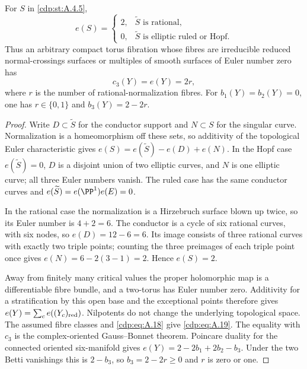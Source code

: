 
\begin{proposition}\label{cdp:st:A.4.6}
For $S$ in \ref{cdp:st:A.4.5},
\[
e(S)=\begin{cases}
2,&\widetilde S\text{ is rational},\\
0,&\widetilde S\text{ is elliptic ruled or Hopf}.
\end{cases}
\tag{A.18}\label{cdp:eq:A.18}
\]
Thus an arbitrary compact torus fibration whose fibres are irreducible reduced normal-crossings surfaces or multiples of smooth surfaces of Euler number zero has
\[
c_3(Y)=e(Y)=2r,
\tag{A.19}\label{cdp:eq:A.19}
\]
where $r$ is the number of rational-normalization fibres. For $b_1(Y)=b_2(Y)=0$, one has $r\in\{0,1\}$ and $b_3(Y)=2-2r$.
\end{proposition}
\begin{proof}
Write $D\subset\widetilde S$ for the conductor support and $N\subset S$ for the singular curve. Normalization is a homeomorphism off these sets, so additivity of the topological Euler characteristic gives $e(S)=e(\widetilde S)-e(D)+e(N)$. In the Hopf case $e(\widetilde S)=0$, $D$ is a disjoint union of two elliptic curves, and $N$ is one elliptic curve; all three Euler numbers vanish. The ruled case has the same conductor curves and $e(\widetilde S)=e(\PP^1)e(E)=0$.

In the rational case the normalization is a Hirzebruch surface blown up twice, so its Euler number is $4+2=6$. The conductor is a cycle of six rational curves, with six nodes, so $e(D)=12-6=6$. Its image consists of three rational curves with exactly two triple points; counting the three preimages of each triple point once gives $e(N)=6-2(3-1)=2$. Hence $e(S)=2$.

Away from finitely many critical values the proper holomorphic map is a differentiable fibre bundle, and a two-torus has Euler number zero. Additivity for a stratification by this open base and the exceptional points therefore gives $e(Y)=\sum_c e((Y_c)_{\rm red})$. Nilpotents do not change the underlying topological space. The assumed fibre classes and \eqref{cdp:eq:A.18} give \eqref{cdp:eq:A.19}. The equality with $c_3$ is the complex-oriented Gauss--Bonnet theorem. Poincare duality for the connected oriented six-manifold gives $e(Y)=2-2b_1+2b_2-b_3$. Under the two Betti vanishings this is $2-b_3$, so $b_3=2-2r\ge0$ and $r$ is zero or one.
\end{proof}



